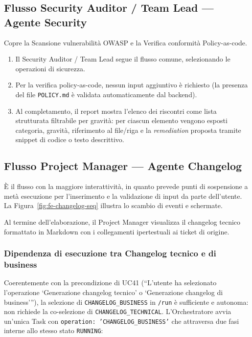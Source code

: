 \documentclass[11pt,a4paper]{article}
\begin{document}
\subsection{Flusso Security Auditor / Team Lead --- Agente Security}

Copre la Scansione vulnerabilità OWASP e la Verifica conformità Policy-as-code.

\begin{enumerate}
    \item Il Security Auditor / Team Lead segue il flusso comune, selezionando le operazioni di sicurezza.
    \item Per la verifica policy-as-code, nessun input aggiuntivo è richiesto (la presenza del file \texttt{POLICY.md} è validata automaticamente dal backend).
    \item Al completamento, il report mostra l'elenco dei riscontri come lista strutturata filtrabile per gravità: per ciascun elemento vengono esposti categoria, gravità, riferimento al file/riga e la \emph{remediation} proposta tramite snippet di codice o testo descrittivo.
\end{enumerate}

\subsection{Flusso Project Manager --- Agente Changelog}

È il flusso con la maggiore interattività, in quanto prevede punti di sospensione a metà esecuzione per l'inserimento e la validazione di input da parte dell'utente. La Figura~\ref{fig:fe-changelog-seq} illustra lo scambio di eventi e schermate.

Al termine dell'elaborazione, il Project Manager visualizza il changelog tecnico formattato in Markdown con i collegamenti ipertestuali ai ticket di origine.

\subsubsection{Dipendenza di esecuzione tra Changelog tecnico e di business}

Coerentemente con la precondizione di UC41 (``L'utente ha selezionato l'operazione `Generazione changelog tecnico' o `Generazione changelog di business'''), la selezione di \texttt{CHANGELOG\_BUSINESS} in \texttt{/run} è sufficiente e autonoma: non richiede la co-selezione di \texttt{CHANGELOG\_TECHNICAL}. L'Orchestratore avvia un'unica Task con \texttt{operation: 'CHANGELOG\_BUSINESS'} che attraversa due fasi interne allo stesso stato \texttt{RUNNING}:
\end{document}
